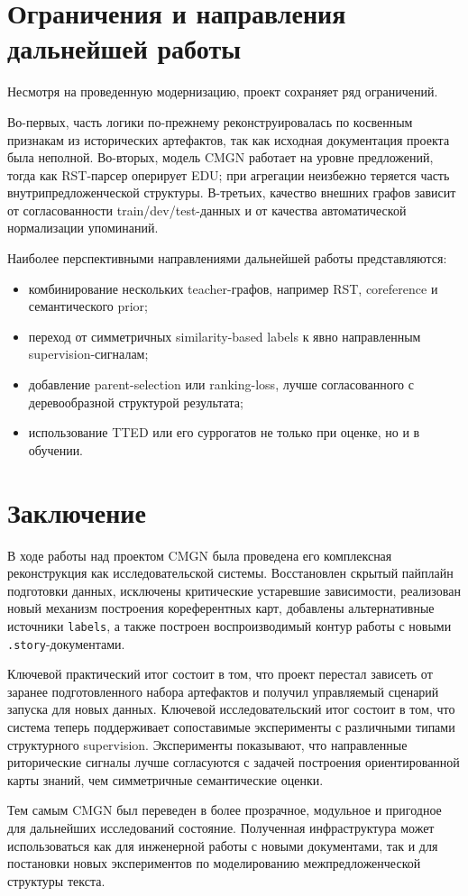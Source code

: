 \documentclass[12pt,a4paper]{article}
\begin{document}
\section{Ограничения и направления дальнейшей работы}

Несмотря на проведенную модернизацию, проект сохраняет ряд ограничений.

Во-первых, часть логики по-прежнему реконструировалась по косвенным признакам из исторических артефактов, так как исходная документация проекта была неполной. Во-вторых, модель CMGN работает на уровне предложений, тогда как RST-парсер оперирует EDU; при агрегации неизбежно теряется часть внутрипредложенческой структуры. В-третьих, качество внешних графов зависит от согласованности train/dev/test-данных и от качества автоматической нормализации упоминаний.

Наиболее перспективными направлениями дальнейшей работы представляются:

\begin{itemize}
    \item комбинирование нескольких teacher-графов, например RST, coreference и семантического prior;
    \item переход от симметричных similarity-based labels к явно направленным supervision-сигналам;
    \item добавление parent-selection или ranking-loss, лучше согласованного с деревообразной структурой результата;
    \item использование TTED или его суррогатов не только при оценке, но и в обучении.
\end{itemize}

\section{Заключение}

В ходе работы над проектом CMGN была проведена его комплексная реконструкция как исследовательской системы. Восстановлен скрытый пайплайн подготовки данных, исключены критические устаревшие зависимости, реализован новый механизм построения кореферентных карт, добавлены альтернативные источники \texttt{labels}, а также построен воспроизводимый контур работы с новыми \texttt{.story}-документами.

Ключевой практический итог состоит в том, что проект перестал зависеть от заранее подготовленного набора артефактов и получил управляемый сценарий запуска для новых данных. Ключевой исследовательский итог состоит в том, что система теперь поддерживает сопоставимые эксперименты с различными типами структурного supervision. Эксперименты показывают, что направленные риторические сигналы лучше согласуются с задачей построения ориентированной карты знаний, чем симметричные семантические оценки.

Тем самым CMGN был переведен в более прозрачное, модульное и пригодное для дальнейших исследований состояние. Полученная инфраструктура может использоваться как для инженерной работы с новыми документами, так и для постановки новых экспериментов по моделированию межпредложенческой структуры текста.
\end{document}
